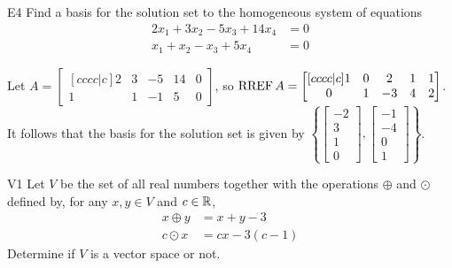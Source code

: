 \documentclass{sbgLAquiz}
\begin{document}
\begin{extract}\newpage\end{extract}
\begin{problem}{E4}
Find a basis for the solution set to the homogeneous system of equations
\begin{align*}
2x_1+3x_2-5x_3+14x_4 &= 0\\
x_1+x_2-x_3+5x_4 &= 0
\end{align*}
\end{problem}
\begin{solution}
Let \(A =
  \begin{bmatrix}[cccc|c]
    2 & 3 & -5 & 14 & 0 \\
    1 & 1 & -1 & 5 & 0
  \end{bmatrix}
\), so \(\operatorname{RREF} A =
  \begin{bmatrix}[cccc|c]
    1 & 0 & 2 & 1 & 1 \\
    0 & 1 & -3 & 4 & 2 \\
  \end{bmatrix}
\).
It follows that the basis for the solution set is given by \(\left\{
  \begin{bmatrix}
    - 2 \\
    3 \\
    1 \\
    0
  \end{bmatrix},
  \begin{bmatrix}
    -1 \\
    - 4 \\
    0 \\
    1
  \end{bmatrix}
\right\}\).
\end{solution}

\begin{problem}{V1}
Let $V$ be the  set of all real numbers together with the operations $\oplus$ and $\odot$ defined by, for any $x,y \in V$ and $c \in \mathbb{R}$,
\begin{align*}
x\oplus y  &= x+y-3 \\
c \odot x &= cx-3(c-1)
\end{align*}
Determine if $V$ is a vector space or not.
\end{problem}
\end{document}
